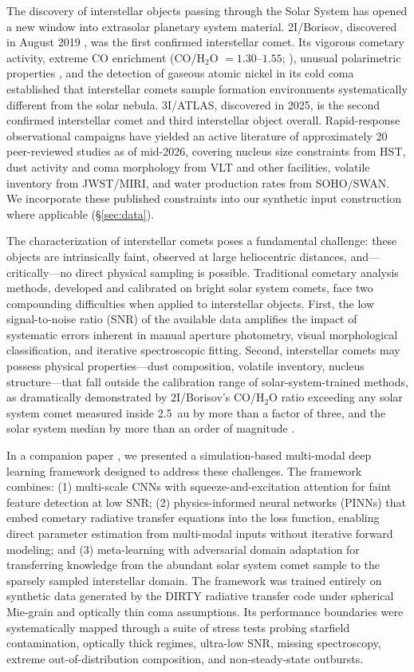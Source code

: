 \documentclass[usenatbib]{mnras}
\begin{document}
The discovery of interstellar objects passing through the Solar System has opened a new window into extrasolar planetary system material. 2I/Borisov, discovered in August 2019 \citep{guzik19}, was the first confirmed interstellar comet. Its vigorous cometary activity, extreme CO enrichment (CO/H$_2$O $= 1.30$--$1.55$; \citealt{bodewits20}), unusual polarimetric properties \citep{bagnulo21}, and the detection of gaseous atomic nickel in its cold coma \citep{guzik21} established that interstellar comets sample formation environments systematically different from the solar nebula. 3I/ATLAS, discovered in 2025, is the second confirmed interstellar comet and third interstellar object overall. Rapid-response observational campaigns have yielded an active literature of approximately 20 peer-reviewed studies as of mid-2026, covering nucleus size constraints from HST, dust activity and coma morphology from VLT and other facilities, volatile inventory from JWST/MIRI, and water production rates from SOHO/SWAN. We incorporate these published constraints into our synthetic input construction where applicable (\S\ref{sec:data}).

The characterization of interstellar comets poses a fundamental challenge: these objects are intrinsically faint, observed at large heliocentric distances, and---critically---no direct physical sampling is possible. Traditional cometary analysis methods, developed and calibrated on bright solar system comets, face two compounding difficulties when applied to interstellar objects. First, the low signal-to-noise ratio (SNR) of the available data amplifies the impact of systematic errors inherent in manual aperture photometry, visual morphological classification, and iterative spectroscopic fitting. Second, interstellar comets may possess physical properties---dust composition, volatile inventory, nucleus structure---that fall outside the calibration range of solar-system-trained methods, as dramatically demonstrated by 2I/Borisov's CO/H$_2$O ratio exceeding any solar system comet measured inside 2.5~au by more than a factor of three, and the solar system median by more than an order of magnitude \citep{bodewits20}.

In a companion paper \citep{paperI}, we presented a simulation-based multi-modal deep learning framework designed to address these challenges. The framework combines: (1) multi-scale CNNs with squeeze-and-excitation attention for faint feature detection at low SNR; (2) physics-informed neural networks (PINNs) that embed cometary radiative transfer equations into the loss function, enabling direct parameter estimation from multi-modal inputs without iterative forward modeling; and (3) meta-learning with adversarial domain adaptation for transferring knowledge from the abundant solar system comet sample to the sparsely sampled interstellar domain. The framework was trained entirely on synthetic data generated by the DIRTY radiative transfer code \citep{gordon01} under spherical Mie-grain and optically thin coma assumptions. Its performance boundaries were systematically mapped through a suite of stress tests probing starfield contamination, optically thick regimes, ultra-low SNR, missing spectroscopy, extreme out-of-distribution composition, and non-steady-state outbursts.
\end{document}

